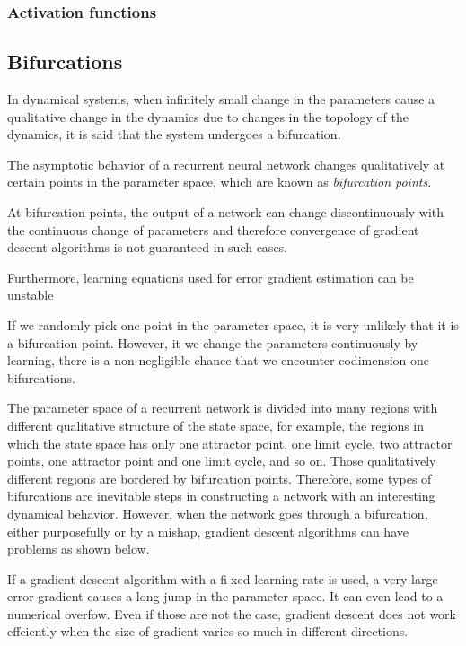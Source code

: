\documentclass{article}
\theoremstyle{definition}
\theoremstyle{remark}
\begin{document}
\subsubsection{Activation functions}
\citep{clevertFastAccurateDeep2016b}


\subsection{Bifurcations}

In dynamical systems, when infinitely small change in the parameters cause a qualitative change in the dynamics due to changes in the topology of the dynamics, it is said that the system undergoes a bifurcation.

The asymptotic behavior of a recurrent neural network changes qualitatively at certain points in the parameter space, which are known as \emph{bifurcation points}.



At bifurcation points, the output of a network can change discontinuously with the continuous change of parameters and therefore convergence of gradient descent algorithms is not guaranteed in such cases.


Furthermore, learning equations used for error gradient estimation can be unstable


If we randomly pick one point in the parameter space, it is very unlikely that it is a bifurcation point. However, it we change the parameters continuously by learning, there is a non-negligible chance that we encounter codimension-one bifurcations.

The parameter space of a recurrent network is divided into many regions with different qualitative structure of the
state space, for example, the regions in which the state space has only one attractor point, one limit cycle, two attractor points, one attractor point and one limit cycle, and so on. Those qualitatively different regions are bordered by bifurcation points. Therefore, some types of bifurcations are inevitable steps in constructing a network with an interesting dynamical behavior. However, when the network goes through a bifurcation, either purposefully or by a mishap, gradient descent algorithms can have problems as shown below.


If a gradient descent algorithm with a fixed learning rate is used, a very large error gradient causes a long jump in the parameter space. It can even lead to a numerical overfow.
 Even if those are not the case, gradient descent does not work effciently when the size of gradient varies so much in different directions.
\end{document}
